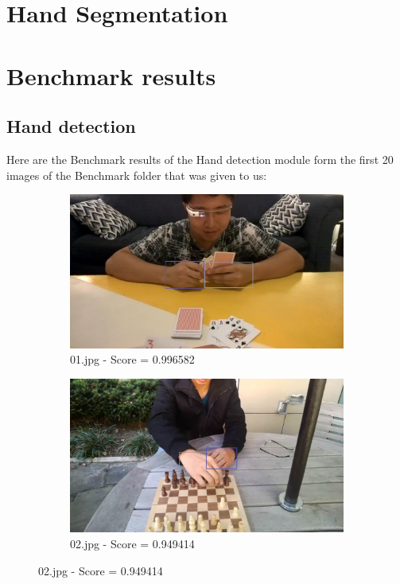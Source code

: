 \section{Hand Segmentation}
\newpage
\section{Benchmark results}

\subsection{Hand detection}
Here are the Benchmark results of the Hand detection module form the first 20 images of the Benchmark folder that was given to us:

\begin{figure}[!h]
    \centering
    \begin{subfigure}[b]{0.3 \textwidth}
        \centering
        \includegraphics[width=\textwidth]{images/handDetection/01.jpg}
        \caption{01.jpg - Score = 0.996582}
        
    \end{subfigure}
    \hfill
    \begin{subfigure}[b]{0.3\textwidth}
        \centering
        \includegraphics[width=\textwidth]{images/handDetection/02.jpg}
        \caption{02.jpg - Score = 0.949414}
       

\end{subfigure}
\end{figure}
